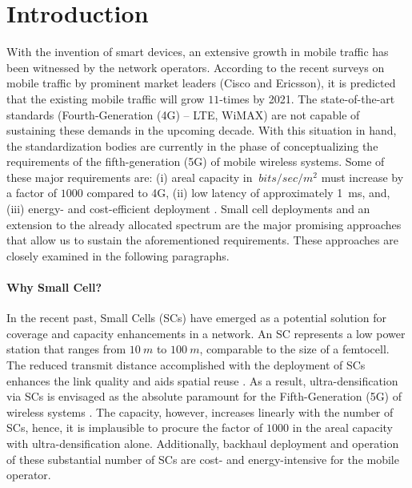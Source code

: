\chapter{Introduction}

With the invention of smart devices, an extensive growth in mobile traffic has been witnessed by the network operators. According to the recent surveys on mobile traffic by prominent market leaders (Cisco \cite{CISCO14} and Ericsson\cite{Eric15}), it is predicted that the existing mobile traffic will grow $11$-times by 2021. The state-of-the-art standards (Fourth-Generation (4G) -- LTE, WiMAX) are not capable of sustaining these demands in the upcoming decade. With this situation in hand, the standardization bodies are currently in the phase of conceptualizing the requirements of the fifth-generation (5G) of mobile wireless systems.
Some of these major requirements are: (i) areal capacity in $\SI{}{bits/sec/m^2}$ must increase by a factor of $1000$ compared to 4G, (ii) low latency of approximately \SI{1}{ms}, and, (iii) energy- and cost-efficient deployment \cite{Qual13, Andrews14}.
Small cell deployments and an extension to the already allocated spectrum are the major promising approaches that allow us to sustain the aforementioned requirements. These approaches are closely examined in the following paragraphs. 

\subsubsection*{Why Small Cell?}

In the recent past, Small Cells (SCs) have emerged as a potential solution for coverage and capacity enhancements in a network. An SC represents a low power station that ranges from $\SI{10}{m}$ to $\SI{100}{m}$, comparable to the size of a femtocell. The reduced transmit distance accomplished with the deployment of SCs enhances the link quality and aids spatial reuse \cite{Chander08}.
As a result, ultra-densification via SCs is envisaged as the absolute paramount for the Fifth-Generation (5G) of wireless systems \cite{Andrews14}.
The capacity, however, increases linearly with the number of SCs, hence, it is implausible to procure the factor of $1000$ in the areal capacity with ultra-densification alone.
Additionally, backhaul deployment and operation of these substantial number of SCs are cost- and energy-intensive for the mobile operator.





